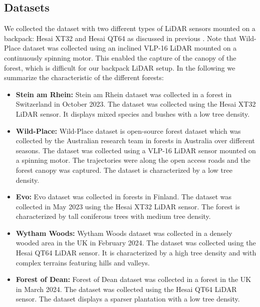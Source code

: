 \subsection*{Datasets} 
We collected the dataset with two different types of LiDAR sensors mounted on a backpack: Hesai XT32 and Hesai QT64  as discussed in previous . Note that Wild-Place\cite{knights2023icra} dataset was collected using an inclined VLP-16 LiDAR mounted on a continuously spinning motor. This enabled the capture of the canopy of the forest, which is difficult for our backpack LiDAR setup. In the following we summarize the characteristic of the different forests:
\begin{itemize}
  \item \textbf{Stein am Rhein:} Stein am Rhein dataset was collected in a forest in Switzerland in October 2023. The dataset was collected using the Hesai XT32 LiDAR sensor. It displays mixed species and bushes with a low tree density.
  \item \textbf{Wild-Place:} Wild-Place dataset is open-source forest dataset which was collected by the Australian research team in forests in Australia over different seasons. The dataset was collected using a VLP-16 LiDAR sensor mounted on a spinning motor. The trajectories were along the open access roads and the forest canopy was captured. The dataset is characterized by a low tree density.
  \item \textbf{Evo:} Evo dataset was collected in forests in Finland. The dataset was collected in May 2023 using the Hesai XT32 LiDAR sensor. The forest is characterized by tall coniferous trees with medium tree density.
  \item \textbf{Wytham Woods:} Wytham Woods dataset was collected in a densely wooded area in the UK in February 2024. The dataset was collected using the Hesai QT64 LiDAR sensor. It is characterized by a high tree density and with complex terrains featuring hills and valleys.  
  \item \textbf{Forest of Dean:} Forest of Dean dataset was collected in a forest in the UK in March 2024. The dataset was collected using the Hesai QT64 LiDAR sensor. The dataset displays a sparser plantation with a low tree density.

\end{itemize}


